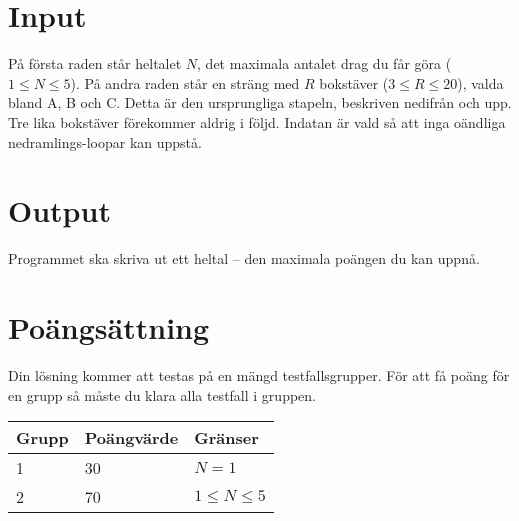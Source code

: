 \section*{Input}
På första raden står heltalet $N$, det maximala antalet drag du får göra ($1 \le N \le 5$). På andra raden står en sträng med $R$ bokstäver ($3 \le R \le 20$), valda bland A, B och C. Detta är den ursprungliga stapeln, beskriven nedifrån och upp. Tre lika bokstäver förekommer aldrig i följd. Indatan är vald så att inga oändliga nedramlings-loopar kan uppstå.

\section*{Output}
Programmet ska skriva ut ett heltal -- den maximala poängen du kan uppnå.


\section*{Poängsättning}
Din lösning kommer att testas på en mängd testfallsgrupper. För att få poäng för en grupp
så måste du klara alla testfall i gruppen.

\begin{tabular}{| l | l | l |}
\hline
Grupp & Poängvärde & Gränser \\ \hline
1     & 30         & $N=1$ \\ 
2     & 70         & $1 \le N \le 5$ \\ \hline
\end{tabular}


